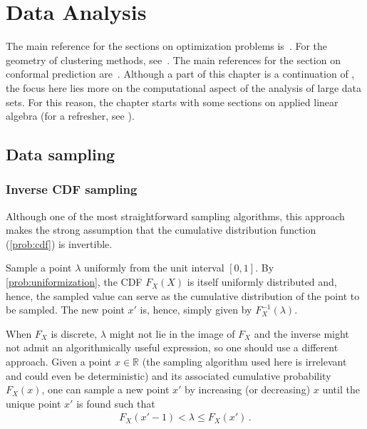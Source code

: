 \chapter{Data Analysis}

    The main reference for the sections on optimization problems is~\citet{shewchuk_introduction_1994}. For the geometry of clustering methods, see~\citet{boissonnat_bregman_2010}. The main references for the section on conformal prediction are~\citet{shafer_tutorial_2008,vovk_algorithmic_2005}. Although a part of this chapter is a continuation of , the focus here lies more on the computational aspect of the analysis of large data sets. For this reason, the chapter starts with some sections on applied linear algebra (for a refresher, see ).

    \minitoc

\section{Data sampling}
\subsection{Inverse CDF sampling}

    Although one of the most straightforward sampling algorithms, this approach makes the strong assumption that the cumulative distribution function (\cref{prob:cdf}) is invertible.

    \begin{method}
        Sample a point $\lambda$ uniformly from the unit interval $[0,1]$. By \cref{prob:uniformization}, the CDF $F_X(X)$ is itself uniformly distributed and, hence, the sampled value can serve as the cumulative distribution of the point to be sampled. The new point $x'$ is, hence, simply given by $F^{-1}_X(\lambda)$.

        When $F_X$ is discrete, $\lambda$ might not lie in the image of $F_X$ and the inverse might not admit an algorithmically useful expression, so one should use a different approach. Given a point $x\in\mathbb{R}$ (the sampling algorithm used here is irrelevant and could even be deterministic) and its associated cumulative probability $F_X(x)$, one can sample a new point $x'$ by increasing (or decreasing) $x$ until the unique point $x'$ is found such that
        \begin{gather}
            F_X(x'-1)<\lambda\leq F_X(x')\,.
        \end{gather}
    \end{method}

